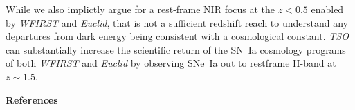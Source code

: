 \documentclass[12pt,preprint]{aastex}
\newcommand{\snia}{SN~Ia\xspace}
\newcommand{\sneia}{SNe~Ia\xspace}
\begin{document}
While we also implictly argue for a rest-frame NIR focus at the $z<0.5$ enabled by {\it WFIRST} and {\it Euclid}, that is not a sufficient redshift reach to understand any departures from dark energy being consistent with a cosmological constant.  {\it TSO} can substantially increase the scientific return of the \snia cosmology programs of both {\it WFIRST} and {\it Euclid} by observing \sneia out to restframe H-band at $z\sim1.5$.


\pagebreak
\textbf{References}

% 


\end{document}
